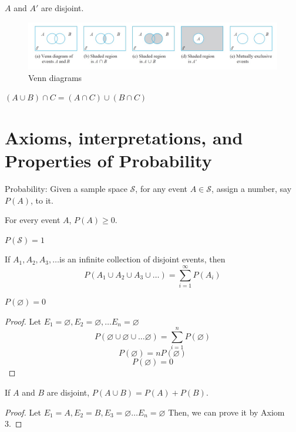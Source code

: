 \begin{prop}
$A$ and $A'$ are disjoint.
\end{prop}


\begin{figure}[H]
\includegraphics[width=15cm]{figures/venn.jpg}
\caption{Venn diagrams}
\label{fig:4}
\end{figure}

\begin{exmp}
  $(A\cup B)\cap C=(A \cap C)\cup(B \cap C)$
\end{exmp}


\section{Axioms, interpretations, and Properties of Probability}
Probability: Given a sample space $\mathcal{S}$, for any event $A\in \mathcal{S}$, assign a number, say $P(A)$, to it.
\begin{axio}
  For every event $A$, $P(A)\geq 0$.
\end{axio}

\begin{axio}
  $P(\mathcal{S})=1$
\end{axio}

\begin{axio}
If $A_1, A_2,A_3,\dots$is an infinite collection of disjoint events, then 
\[  P(A_1 \cup A_2\cup A_3 \cup \dots)=\sum_{i=1}^{\infty}P(A_i)
\]
\end{axio}

\begin{prop}
$P(\varnothing)=0$
\begin{proof}
Let $E_1=\varnothing,E_2=\varnothing,\dots E_n=\varnothing$
\[P(\varnothing \cup \varnothing \cup \dots \varnothing)=\sum_{i=1}^n P(\varnothing)\]
\[P(\varnothing)=nP(\varnothing)\]
\[P(\varnothing)=0\]
\end{proof}
\end{prop}

\begin{prop}
If $A$ and $B$ are disjoint, $P(A \cup B)=P(A)+P(B)$.
\begin{proof}
Let $E_1=A,E_2=B,E_3=\varnothing \dots E_n=\varnothing$
Then, we can prove it by Axiom 3.
\end{proof}
\end{prop}

